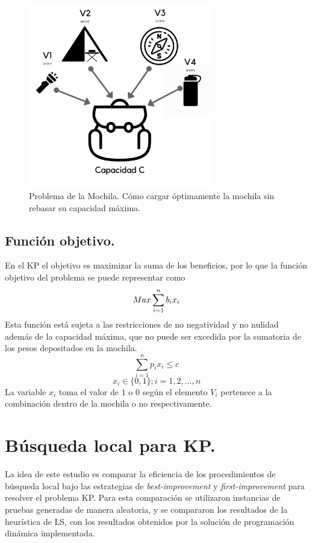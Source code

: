 \documentclass{ci5652}
\begin{document}
	 	\begin{figure}[h]
	 	\caption{Problema de la Mochila. Cómo cargar óptimamente la mochila sin rebasar su capacidad máxima.}
		\includegraphics[width=8cm, height=8cm]{KP.png}
		\end{figure}

	\subsection{Función objetivo.}
		En el KP el objetivo es maximizar la suma de los beneficios, por lo que la función objetivo del problema se puede representar como
		$$
			Max \sum_{i=1}^{n} b_i x_i \\
		$$
		Esta función está sujeta a las restricciones de no negatividad y no nulidad además de la capacidad máxima, que no puede ser excedida por la sumatoria de los pesos depositados en la mochila.
		$$
			\sum_{i=1}^{n} p_i x_i \leq c
		$$
		$$
		x_i \in \{0,1\};i=1,2,\ldots,n
		$$
		La variable $x_i$ toma el valor de $1$ o $0$ según el elemento $V_i$ pertenece a la combinación dentro de la mochila o no respectivamente.

\section{Búsqueda local para KP.}
	La idea de este estudio es comparar la eficiencia de los procedimientos de búsqueda local bajo las estrategias de \textit{best-improvement} y \textit{first-improvement} para resolver el problema KP. Para esta comparación se utilizaron instancias de pruebas generadas de manera aleatoria, y se compararon los resultados de la heurística de LS, con los resultados obtenidos por la solución de programación dinámica implementada.\\
\end{document}
